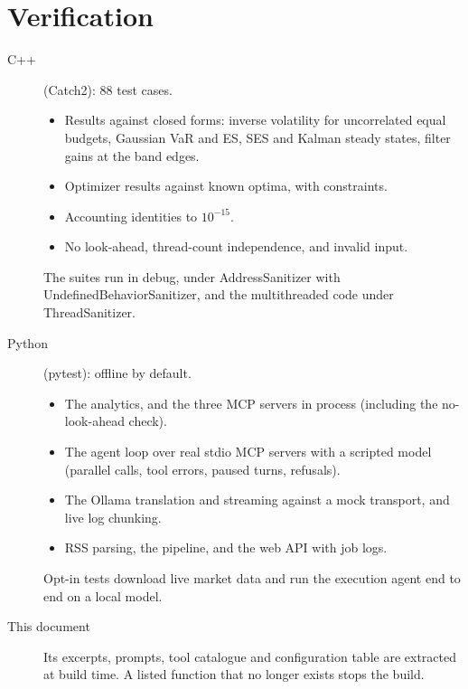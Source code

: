 \documentclass[11pt,a4paper]{article}
\begin{document}
\section{Verification}\label{sec:verification}
\begin{description}
  \item[C++] (Catch2): 88 test cases.
        \begin{itemize}
          \item Results against closed forms: inverse volatility for uncorrelated equal
                budgets, Gaussian VaR and ES, SES and Kalman steady states, filter gains at
                the band edges.
          \item Optimizer results against known optima, with constraints.
          \item Accounting identities to $10^{-15}$.
          \item No look-ahead, thread-count independence, and invalid input.
        \end{itemize}
        The suites run in debug, under AddressSanitizer with UndefinedBehaviorSanitizer,
        and the multithreaded code under ThreadSanitizer.
  \item[Python] (pytest): offline by default.
        \begin{itemize}
          \item The analytics, and the three MCP servers in process (including the
                no-look-ahead check).
          \item The agent loop over real stdio MCP servers with a scripted model (parallel
                calls, tool errors, paused turns, refusals).
          \item The Ollama translation and streaming against a mock transport, and live
                log chunking.
          \item RSS parsing, the pipeline, and the web API with job logs.
        \end{itemize}
        Opt-in tests download live market data and run the execution agent end to end on a
        local model.
  \item[This document] Its excerpts, prompts, tool catalogue and configuration table are
        extracted at build time. A listed function that no longer exists stops the build.
\end{description}
\end{document}
